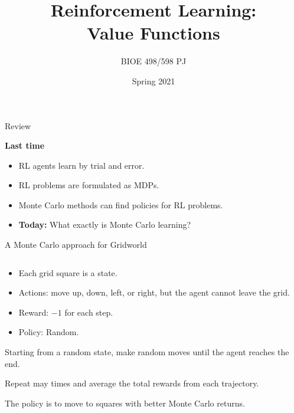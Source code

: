 \documentclass[9pt]{beamer}
\title{Reinforcement Learning:\\Value Functions}
\author{BIOE 498/598 PJ}
\date{Spring 2021}
\newcommand\lspace{\addtolength{\itemsep}{0.5\baselineskip}}
\begin{document}
\frame{\titlepage}

\begin{frame}{Review}

\textbf{Last time}
\begin{itemize}\lspace
	\item RL agents learn by trial and error.
	\item RL problems are formulated as MDPs.
	\item Monte Carlo methods can find policies for RL problems.
	\item<2-> \textbf{Today:} What exactly is Monte Carlo learning?
\end{itemize}
	
\end{frame}

\begin{frame}{A Monte Carlo approach for Gridworld}

\begin{columns}
\begin{column}{0.5\textwidth}
	\begin{itemize}
		\item Each grid square is a state.
		\item Actions: move up, down, left, or right, but the agent cannot leave the grid.
		\item Reward: $-1$ for each step.
		\item Policy: Random.
	\end{itemize}
	
\bigskip
Starting from a random state, make random moves until the agent reaches the end.

\bigskip
Repeat may times and average the total rewards from each trajectory.

\bigskip
The policy is to move to squares with better Monte Carlo returns.
\end{column}


\end{columns}
\end{frame}
\end{document}
